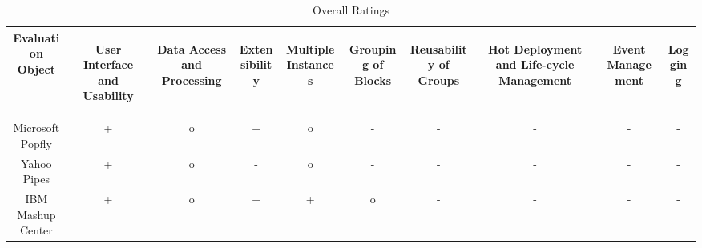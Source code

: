 \begin{table}[h]
	\centering
		\begin{tabular}{|c|c|c|c|c|c|c|c|c|c|}
			\hline
				\textbf{Evaluation Object} & 
				\begin{sideways}\textbf{User Interface and Usability}\end{sideways} &
				\begin{sideways}\textbf{Data Access and Processing}\end{sideways} &
                \begin{sideways}\textbf{Extensibility}\end{sideways} &
                \begin{sideways}\textbf{Multiple Instances}\end{sideways} &
                \begin{sideways}\textbf{Grouping of Blocks}\end{sideways} &
                \begin{sideways}\textbf{Reusability of Groups}\end{sideways} &
                \begin{sideways}\textbf{Hot Deployment and Life-cycle Management}\end{sideways} &
				\begin{sideways}\textbf{Event Management}\end{sideways} &
                \begin{sideways}\textbf{Logging}\end{sideways}\\
                \hline Microsoft Popfly 	& + & o & + & o & - & - & - & - & -\\
                \hline Yahoo Pipes 			& + & o & - & o & - & - & - & - & -\\
                \hline IBM Mashup Center 	& + & o & + & + & o & - & - & - & -\\
			\hline
		\end{tabular}
	\caption{Overall Ratings}
	\label{tab:RatingsTableWithoutWeightingFactors}
\end{table}